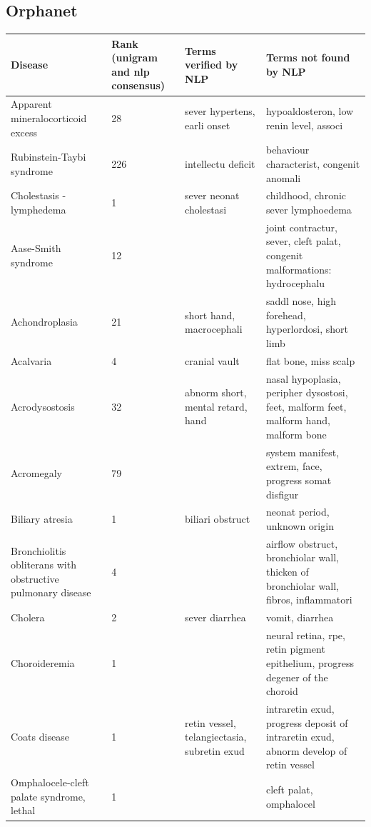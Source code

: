 \documentclass[10pt,letterpaper,final]{article}
\begin{document}
\subsection{Orphanet}
\label{app:orphanet_tfidf_tfidfrecalc}
\begin{center}
\begin{small}
	\begin{longtable}{|p{3.5cm}|p{1.5cm}|p{3cm}|p{3cm}|}
	\hline
	\textbf{Disease}  & \textbf{Rank (unigram and nlp consensus)} & \textbf{Terms verified by NLP}  & \textbf{Terms not found by NLP} \\
	\hline\hline
Apparent mineralocorticoid excess & 28 & sever hypertens, earli onset & hypoaldosteron, low renin level, associ \\ \hline
Rubinstein-Taybi syndrome & 226 & intellectu deficit & behaviour characterist, congenit anomali \\ \hline
Cholestasis - lymphedema & 1 & sever neonat cholestasi &  childhood, chronic sever lymphoedema \\ \hline
Aase-Smith syndrome & 12 &   & joint contractur, sever, cleft palat, congenit malformations: hydrocephalu \\ \hline
Achondroplasia & 21 & short hand, macrocephali & saddl nose, high forehead, hyperlordosi, short limb \\ \hline
Acalvaria & 4 & cranial vault &  flat bone, miss scalp \\ \hline
Acrodysostosis & 32 & abnorm short, mental retard, hand & nasal hypoplasia, peripher dysostosi, feet, malform feet, malform hand, malform bone \\ \hline
Acromegaly & 79 &  & system manifest, extrem, face, progress somat disfigur \\ \hline
Biliary atresia & 1 & biliari obstruct &  neonat period, unknown origin \\ \hline
Bronchiolitis obliterans with obstructive pulmonary disease & 4 &  &  airflow obstruct, bronchiolar wall, thicken of bronchiolar wall, fibros, inflammatori \\ \hline
Cholera & 2 & sever diarrhea &  vomit, diarrhea  \\ \hline
Choroideremia & 1 &  &  neural retina, rpe, retin pigment epithelium, progress degener of the choroid \\ \hline
Coats disease & 1 & retin vessel, telangiectasia, subretin exud &  intraretin exud, progress deposit of intraretin exud, abnorm develop of retin vessel \\ \hline
Omphalocele-cleft palate syndrome, lethal & 1 &  &  cleft palat, omphalocel \\ \hline

\end{longtable}
\end{small}
\end{center}
\end{document}
